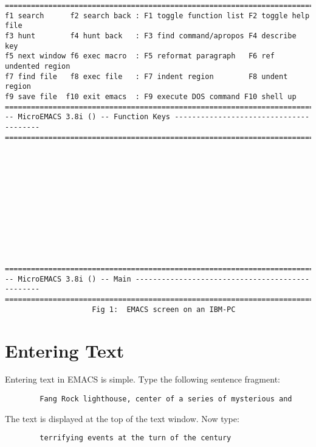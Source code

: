 \begin{verbatim}
===============================================================================
f1 search      f2 search back : F1 toggle function list F2 toggle help file
f3 hunt        f4 hunt back   : F3 find command/apropos F4 describe key
f5 next window f6 exec macro  : F5 reformat paragraph   F6 ref undented region
f7 find file   f8 exec file   : F7 indent region        F8 undent region
f9 save file  f10 exit emacs  : F9 execute DOS command F10 shell up
===============================================================================
-- MicroEMACS 3.8i () -- Function Keys ---------------------------------------
===============================================================================












===============================================================================
-- MicroEMACS 3.8i () -- Main ------------------------------------------------
===============================================================================
                    Fig 1:  EMACS screen on an IBM-PC
\end{verbatim}

\section{Entering Text}

Entering text in EMACS is simple.  Type the following sentence fragment:

\begin{verbatim}
        Fang Rock lighthouse, center of a series of mysterious and
\end{verbatim}

The text is displayed at the top of the text window.  Now type:

\begin{verbatim}
        terrifying events at the turn of the century
\end{verbatim}


